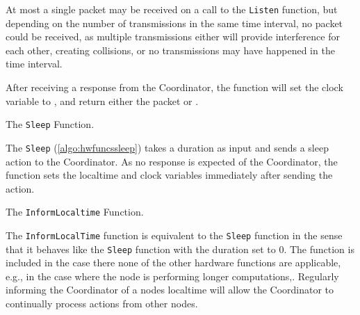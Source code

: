 At most a single packet may be received on a call to the \texttt{Listen} function, but depending on the number
of transmissions in the same time interval, no packet could be received, as multiple transmissions either will
provide interference for each other, creating collisions, or no transmissions may have happened in the time
interval.

After receiving a response from the Coordinator, the function will set the clock variable to \KwNow, and
return either the packet or \KwNull. \medbreak

\begin{algorithm}[ht]
    \DontPrintSemicolon
    
    
    \caption{The \texttt{Sleep} Function.}
    \label{algo:hwfuncssleep}
\end{algorithm}

The \texttt{Sleep} (\autoref{algo:hwfuncssleep}) takes a duration as input and sends a sleep action to the
Coordinator. As no response is expected of the Coordinator, the function sets the localtime and clock
variables immediately after sending the action. \medbreak

\begin{algorithm}[ht]
    \DontPrintSemicolon
    
    
    \caption{The \texttt{InformLocaltime} Function.}
    \label{algo:hwfuncsupdatelocaltime}
\end{algorithm}

The \texttt{InformLocalTime} function is equivalent to the \texttt{Sleep} function in the sense that it
behaves like the \texttt{Sleep} function with the duration set to 0. The function is included in the case
there none of the other hardware functions are applicable, e.g., in the case where the node is performing
longer computations,. Regularly informing the Coordinator of a nodes localtime will allow the Coordinator to
continually process actions from other nodes.